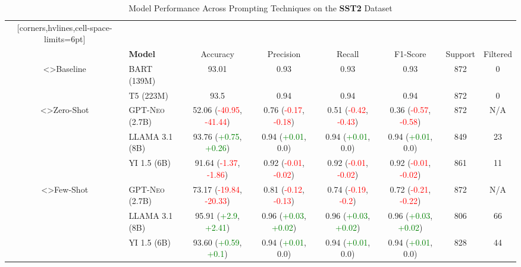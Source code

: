 \documentclass[twocolumn]{article}
\begin{document}
\begin{sidewaystable}[ht]
\centering
\caption{Model Performance Across Prompting Techniques on the \textbf{SST2} Dataset}
\vspace{10pt}
\label{tab:model_performance_sst2}
\begin{NiceTabular}{cl*{6}{c}}[corners,hvlines,cell-space-limits=6pt]
    &   
        &  \\
    & \textbf{Model}  
        & Accuracy & Precision & Recall & F1-Score & Support & Filtered \\

<\rotate>{Baseline}
	 & \textsc{BART (139M)} & 93.01 & 0.93 & 0.93 & 0.93 & 872 & 0 \\
	 & \textsc{T5 (223M)} & 93.5 & 0.94 & 0.94 & 0.94 & 872 & 0 \\

<\rotate>{Zero-Shot}
	 & \textsc{GPT-Neo (2.7B)} & 52.06 (\textcolor{Red}{-40.95}, \textcolor{Red}{-41.44}) & 0.76 (\textcolor{Red}{-0.17}, \textcolor{Red}{-0.18}) & 0.51 (\textcolor{Red}{-0.42}, \textcolor{Red}{-0.43}) & 0.36 (\textcolor{Red}{-0.57}, \textcolor{Red}{-0.58}) & 872 & N/A \\
	 & \textsc{LLAMA 3.1 (8B)} & 93.76 (\textcolor{Green}{+0.75}, \textcolor{Green}{+0.26}) & 0.94 (\textcolor{Green}{+0.01}, 0.0) & 0.94 (\textcolor{Green}{+0.01}, 0.0) & 0.94 (\textcolor{Green}{+0.01}, 0.0) & 849 & 23 \\
	 & \textsc{YI 1.5 (6B)} & 91.64 (\textcolor{Red}{-1.37}, \textcolor{Red}{-1.86}) & 0.92 (\textcolor{Red}{-0.01}, \textcolor{Red}{-0.02}) & 0.92 (\textcolor{Red}{-0.01}, \textcolor{Red}{-0.02}) & 0.92 (\textcolor{Red}{-0.01}, \textcolor{Red}{-0.02}) & 861 & 11 \\

<\rotate>{Few-Shot}
	 & \textsc{GPT-Neo (2.7B)} & 73.17 (\textcolor{Red}{-19.84}, \textcolor{Red}{-20.33}) & 0.81 (\textcolor{Red}{-0.12}, \textcolor{Red}{-0.13}) & 0.74 (\textcolor{Red}{-0.19}, \textcolor{Red}{-0.2}) & 0.72 (\textcolor{Red}{-0.21}, \textcolor{Red}{-0.22}) & 872 & N/A \\
	 & \textsc{LLAMA 3.1 (8B)} & 95.91 (\textcolor{Green}{+2.9}, \textcolor{Green}{+2.41}) & 0.96 (\textcolor{Green}{+0.03}, \textcolor{Green}{+0.02}) & 0.96 (\textcolor{Green}{+0.03}, \textcolor{Green}{+0.02}) & 0.96 (\textcolor{Green}{+0.03}, \textcolor{Green}{+0.02}) & 806 & 66 \\
	 & \textsc{YI 1.5 (6B)} & 93.60 (\textcolor{Green}{+0.59}, \textcolor{Green}{+0.1}) & 0.94 (\textcolor{Green}{+0.01}, 0.0) & 0.94 (\textcolor{Green}{+0.01}, 0.0) & 0.94 (\textcolor{Green}{+0.01}, 0.0) & 828 & 44 \\


\end{NiceTabular}
\end{sidewaystable}
\end{document}
